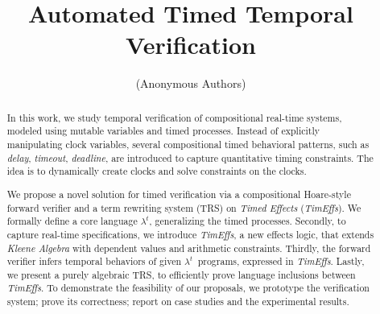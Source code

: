 \documentclass[acmsmall,10pt,review]{acmart}
\newcommand{\timedEffects}{\emph{TimEffs}}
\newcommand{\code}[1]{{\tt{\ensuremath{\m{#1}}}}}
\newcommand{\m}{\mathit}
\newcommand{\timedL}{\code{\lambda^{t}}}
\begin{document}
\title{Automated Timed Temporal Verification
}





\author{(Anonymous Authors)}






\begin{abstract} 
In this work, we study temporal verification of 
compositional real-time systems, modeled 
using mutable variables and timed processes.  
Instead of explicitly manipulating clock variables, 
several compositional timed behavioral patterns, 
such as \emph{delay}, \emph{timeout}, \emph{deadline},  
are introduced to capture quantitative timing constraints.
The idea is to dynamically create clocks  
and solve constraints on the clocks. 

We propose a novel solution for timed verification via a 
compositional Hoare-style forward verifier and a 
term rewriting system (TRS) on \emph{Timed Effects} (\timedEffects).  
We formally define 
a core language \timedL, generalizing the timed processes.
Secondly, to capture real-time specifications, 
we introduce \timedEffects, a new effects logic, 
that extends 
\emph{Kleene Algebra} with dependent
values and arithmetic constraints.
Thirdly,  the forward verifier infers temporal behaviors of given 
\timedL\ programs, expressed in \timedEffects. 
Lastly, we present a purely algebraic TRS, to 
efficiently prove language inclusions between 
 \timedEffects. 
To demonstrate the feasibility of our proposals, 
we prototype the verification system; prove its 
correctness; report on case studies and the experimental results. 

 

\end{abstract}
\end{document}
